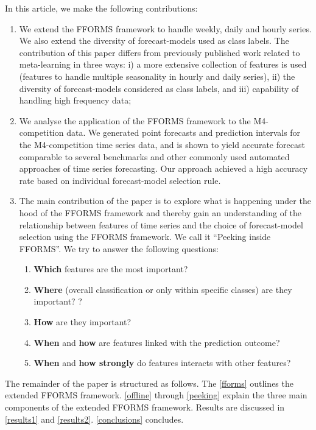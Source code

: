 \documentclass[11pt,a4paper,]{article}
\providecommand{\tightlist}{%
  \setlength{\itemsep}{0pt}\setlength{\parskip}{0pt}}
\begin{document}
In this article, we make the following contributions:

\begin{enumerate}
\def\labelenumi{\arabic{enumi}.}
\tightlist
\item
  We extend the FFORMS framework to handle weekly, daily and hourly series. We also extend the diversity of forecast-models used as class labels. The contribution of this paper differs from previously published work related to meta-learning \autocites{prudencio2004meta}{lemke2010meta}{kuck2016meta} in three ways: i) a more extensive collection of features is used (features to handle multiple seasonality in hourly and daily series), ii) the diversity of forecast-models considered as class labels, and iii) capability of handling high frequency data;
\item
  We analyse the application of the FFORMS framework to the M4-competition data. We generated point forecasts and prediction intervals for the M4-competition time series data, and is shown to yield accurate forecast comparable to several benchmarks and other commonly used automated approaches of time series forecasting. Our approach achieved a high accuracy rate based on individual forecast-model selection rule.
\item
  The main contribution of the paper is to explore what is happening under the hood of the FFORMS framework and thereby gain an understanding of the relationship between features of time series and the choice of forecast-model selection using the FFORMS framework. We call it ``Peeking inside FFORMS''. We try to answer the following questions:

  \begin{enumerate}
  \def\labelenumii{\roman{enumii})}
  \tightlist
  \item
    \textbf{Which} features are the most important?
  \item
    \textbf{Where} (overall classification or only within specific classes) are they important? ?
  \item
    \textbf{How} are they important?
  \item
    \textbf{When} and \textbf{how} are features linked with the prediction outcome?
  \item
    \textbf{When} and \textbf{how strongly} do features interacts with other features?
  \end{enumerate}
\end{enumerate}

The remainder of the paper is structured as follows. The \autoref{fforms} outlines the extended FFORMS framework. \autoref{offline} through \autoref{peeking} explain the three main components of the extended FFORMS framework. Results are discussed in \autoref{results1} and \autoref{results2}. \autoref{conclusions} concludes.
\end{document}
